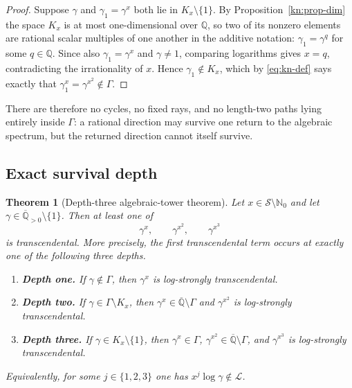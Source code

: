 \documentclass[11pt,oneside]{article}
\newtheorem{theorem}{Theorem}[section]
\theoremstyle{definition}
\theoremstyle{remark}
\newcommand{\Nzero}{\mathbb N_0}
\newcommand{\Q}{\mathbb Q}
\newcommand{\Abar}{\overline{\mathbb Q}}
\newcommand{\Sol}{\mathcal S}
\newcommand{\Apos}{\Abar_{>0}}
\newcommand{\LL}{\mathcal L}
\newcommand{\GammaSat}{\Gamma}
\begin{document}
\begin{proof}
Suppose $\gamma$ and $\gamma_1=\gamma^x$ both lie in $K_x\setminus\{1\}$.  By
Proposition~\ref{kn:prop-dim} the space $K_x$ is at most one-dimensional over $\Q$, so
two of its nonzero elements are rational scalar multiples of one another in the additive
notation: $\gamma_1=\gamma^q$ for some $q\in\Q$.  Since also $\gamma_1=\gamma^x$ and
$\gamma\ne1$, comparing logarithms gives $x=q$, contradicting the irrationality of $x$.
Hence $\gamma_1\notin K_x$, which by \eqref{eq:kn-def} says exactly that
$\gamma_1^x=\gamma^{x^2}\notin\GammaSat$.
\end{proof}

There are therefore no cycles, no fixed rays, and no length-two paths lying entirely inside
$\GammaSat$: a rational direction may survive one return to the algebraic spectrum, but the
returned direction cannot itself survive.

\subsection{Exact survival depth}

\begin{theorem}[Depth-three algebraic-tower theorem]
\label{tw:depth-three}
Let $x\in\Sol\setminus\Nzero$ and let $\gamma\in\Apos\setminus\{1\}$.  Then at least one of
\[
 \gamma^x,\qquad\gamma^{x^2},\qquad\gamma^{x^3}
\]
is transcendental.  More precisely, the first transcendental term occurs at exactly one of
the following three depths.
\begin{enumerate}[label=\textup{(\arabic*)}]
\item \textbf{Depth one.}  If $\gamma\notin\GammaSat$, then $\gamma^x$ is log-strongly
transcendental.
\item \textbf{Depth two.}  If $\gamma\in\GammaSat\setminus K_x$, then
$\gamma^x\in\Abar\setminus\GammaSat$ and $\gamma^{x^2}$ is log-strongly transcendental.
\item \textbf{Depth three.}  If $\gamma\in K_x\setminus\{1\}$, then $\gamma^x\in\GammaSat$,
$\gamma^{x^2}\in\Abar\setminus\GammaSat$, and $\gamma^{x^3}$ is log-strongly transcendental.
\end{enumerate}
Equivalently, for some $j\in\{1,2,3\}$ one has $x^j\log\gamma\notin\LL$.
\end{theorem}
\end{document}
